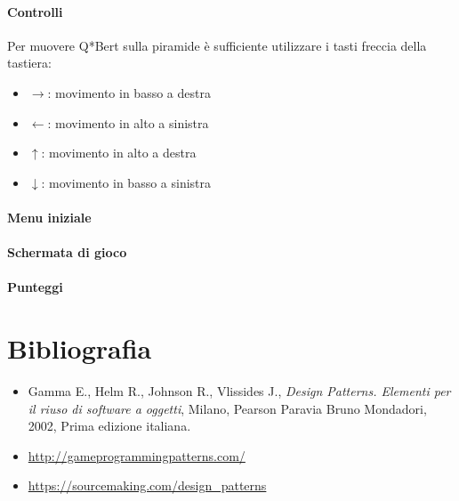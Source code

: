 \documentclass[a4paper,12pt, hidelinks]{report}
\begin{document}
\subsubsection{Controlli}

Per muovere Q*Bert sulla piramide è sufficiente utilizzare i tasti freccia della tastiera:

\begin{itemize}
	\item \textbf{$\rightarrow$}: movimento in basso a destra
	\item \textbf{$\leftarrow$}: movimento in alto a sinistra
	\item \textbf{$\uparrow$}: movimento in alto a destra
	\item \textbf{$\downarrow$}: movimento in basso a sinistra
\end{itemize}

\subsubsection{Menu iniziale}

\subsubsection{Schermata di gioco}

\subsubsection{Punteggi}

\chapter{Bibliografia}

\begin{itemize}
	\item Gamma E., Helm R., Johnson R., Vlissides J., \emph{Design Patterns. Elementi per il riuso di software a oggetti}, Milano, Pearson Paravia Bruno Mondadori, 2002, Prima edizione italiana.
	\item \href{http://gameprogrammingpatterns.com/}{http://gameprogrammingpatterns.com/}
	\item \href{https://sourcemaking.com/design\_patterns}{https://sourcemaking.com/design\_patterns}

\end{itemize}

%
%
\end{document}
